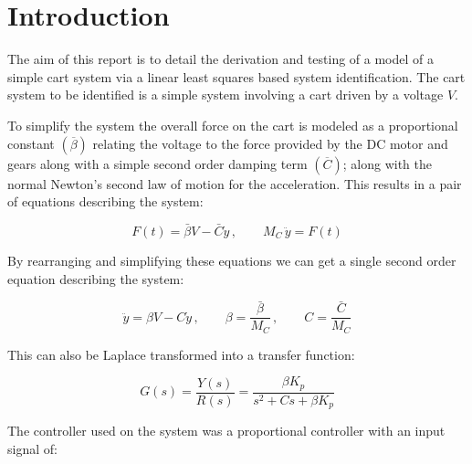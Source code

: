 \section*{Introduction}

\newcommand{\lesspace}{\vspace{-8pt}}
\newcommand{\lessspace}{\vspace{-20pt}}

The aim of this report is to detail the derivation and testing of a model of a
simple cart system via a linear least squares based system identification.  The
cart system to be identified is a simple system involving a cart driven by a
voltage $V$.  

To simplify the system the overall force on the cart is modeled as a
proportional constant $\left(\overline\beta\right)$ relating the voltage to the
force provided by the DC motor and gears along with a simple second order
damping term $\left(\overline{C}\right)$; along with the normal Newton's second
law of motion for the acceleration.  This results in a pair of equations
describing the system:

\lessspace

\begin{equation}
F\left(t\right) = \bar\beta V - \bar{C} \dot{y} \, , \qquad M_C \, \ddot{y} = F\left(t\right)
\end{equation}

By rearranging and simplifying these equations we can get a single second order
equation describing the system:

\lesspace

\begin{equation}
\ddot{y} = \beta V - C \dot{y} \, , \qquad  \beta = \frac{\bar\beta}{M_C} \, , \qquad C = \frac{\bar{C}}{M_C}
\end{equation}

This can also be Laplace transformed into a transfer function:

\lesspace

\begin{equation}\label{transfer-function}
G\left(s\right) = \frac{Y\left(s\right)}{R\left(s\right)} = \frac{\beta K_p}{s^2
+ C s + \beta K_p}
\end{equation}

The controller used on the system was a proportional controller with an input
signal of: 

